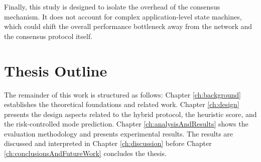 Finally, this study is designed to isolate the overhead of the consensus mechanism. It does not account for complex application-level state machines, which could shift the overall performance bottleneck away from the network and the consensus protocol itself.

\section{Thesis Outline}
The remainder of this work is structured as follows: Chapter \ref{ch:background} establishes the theoretical foundations and related work. Chapter \ref{ch:design} presents the design aspects related to the hybrid protocol, the heuristic score, and the risk-controlled mode prediction. Chapter \ref{ch:analysisAndResults} shows the evaluation methodology and presents experimental results. The results are discussed and interpreted in Chapter \ref{ch:discussion} before Chapter \ref{ch:conclusionsAndFutureWork} concludes the thesis.